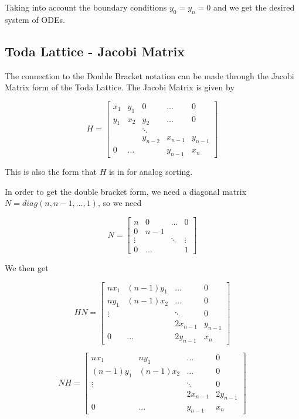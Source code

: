 \documentclass{article}
\begin{document}
Taking into account the boundary conditions $y_0=y_n=0$ and we get the desired system of ODEs.

\subsection{Toda Lattice - Jacobi Matrix}

The connection to the Double Bracket notation can be made through the Jacobi Matrix form of the Toda Lattice. The Jacobi Matrix is given by

\[ H = \begin{bmatrix}
    x_{1} & y_{1} & 0  & \dots & 0 \\
    y_{1} & x_{2} & y_{2} & \dots & 0 \\
     & & \ddots & \\
          &       & y_{n-2} & x_{n-1} & y_{n-1}\\
    0 & \hdots & & y_{n-1} & x_{n}
\end{bmatrix}\]

This is also the form that $H$ is in for analog sorting.

In order to get the double bracket form, we need a diagonal matrix $N = diag(n, n-1, \dots, 1)$, so we need 

\[
N = \begin{bmatrix}
        n & 0 & \hdots & 0 \\
        0 & n-1 & \\
        \vdots &  & \ddots & \vdots \\
        0 & \hdots & & 1
    \end{bmatrix}
\]

We then get 

\[ 
HN = \begin{bmatrix}
        nx_1 & (n-1)y_1 & \hdots & 0 \\
        ny_1 & (n-1)x_2 & \hdots & 0 \\
        \vdots & & \ddots & 0\\
         &  & 2x_{n-1} & y_{n-1} \\
        0 & \hdots & 2y_{n-1} & x_n

    \end{bmatrix}
\]

\[ 
NH = \begin{bmatrix}
        nx_1 & ny_1 & \hdots & 0 \\
        (n-1)y_1 & (n-1)x_2 & \hdots & 0 \\
        \vdots & & \ddots & 0\\
         &  & 2x_{n-1} & 2y_{n-1} \\
        0 & \hdots & y_{n-1} & x_n

    \end{bmatrix}
\]
\end{document}
